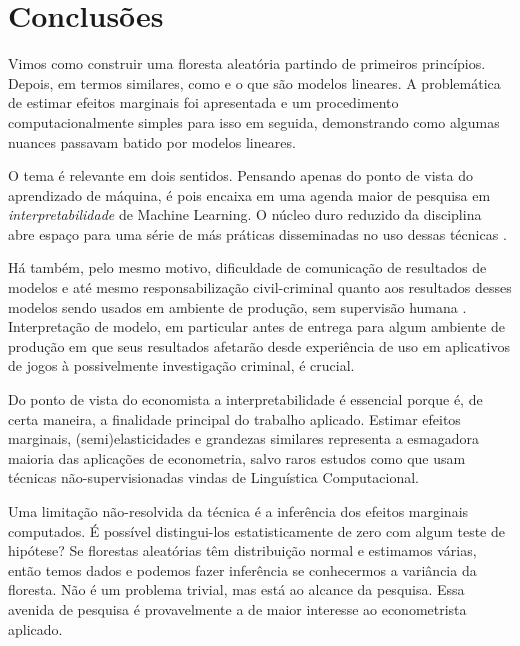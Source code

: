\chapter{Conclusões}
\label{cap:conclusoes}

Vimos como construir uma floresta aleatória partindo de primeiros princípios. Depois, em termos similares, como e o que são modelos lineares. A problemática de estimar efeitos marginais foi apresentada e um procedimento computacionalmente simples para isso em seguida, demonstrando como algumas nuances passavam batido por modelos lineares.

O tema é relevante em dois sentidos. Pensando apenas do ponto de vista do aprendizado de máquina, é pois encaixa em uma agenda maior de pesquisa em \textit{interpretabilidade} de Machine Learning. O núcleo duro reduzido da disciplina abre espaço para uma série de más práticas disseminadas no uso dessas técnicas \cite{flach2019performance}.

Há também, pelo mesmo motivo, dificuldade de comunicação de resultados de modelos e até mesmo responsabilização civil-criminal quanto aos resultados desses modelos sendo usados em ambiente de produção, sem supervisão humana \cite{lepri2018fair}. Interpretação de modelo, em particular antes de entrega para algum ambiente de produção em que seus resultados afetarão desde experiência de uso em aplicativos de jogos à possivelmente investigação criminal, é crucial. 

Do ponto de vista do economista a interpretabilidade é essencial porque é, de certa maneira, a finalidade principal do trabalho aplicado. Estimar efeitos marginais, (semi)elasticidades e grandezas similares representa a esmagadora maioria das aplicações de econometria, salvo raros estudos como  que usam técnicas não-supervisionadas vindas de Linguística Computacional.

Uma limitação não-resolvida da técnica é a inferência dos efeitos marginais computados. É possível distingui-los estatisticamente de zero com algum teste de hipótese? Se florestas aleatórias têm distribuição normal e estimamos várias, então temos dados e podemos fazer inferência se conhecermos a variância da floresta. Não é um problema trivial, mas está ao alcance da pesquisa. Essa avenida de pesquisa é provavelmente a de maior interesse ao econometrista aplicado.




